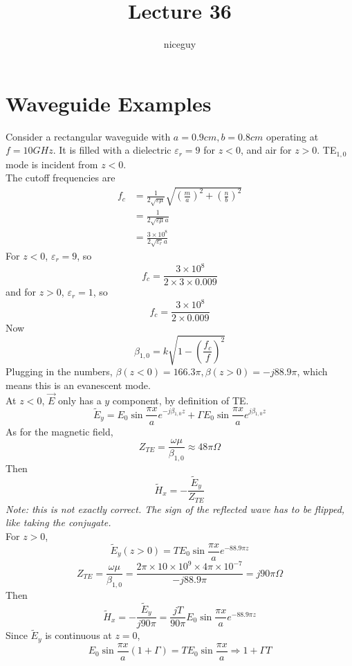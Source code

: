 \documentclass[12pt]{article}
\title{Lecture 36}
\author{niceguy}
\begin{document}
\maketitle

\section{Waveguide Examples}

\begin{ex}
    Consider a rectangular waveguide with $a = 0.9\unit{cm}, b = 0.8\unit{cm}$ operating at $f = 10\unit{GHz}$. It is filled with a dielectric $\varepsilon_r = 9$ for $z < 0$, and air for $z > 0$. TE$_{1,0}$ mode is incident from $z < 0$. \\
    The cutoff frequencies are
    \begin{align*}
        f_c &= \frac{1}{2\sqrt{\varepsilon\mu}} \sqrt{\left(\frac{m}{a}\right)^2 + \left(\frac{n}{b}\right)^2} \\
            &= \frac{1}{2\sqrt{\varepsilon\mu}a} \\
            &= \frac{3 \times 10^8}{2\sqrt{\varepsilon_r}a}
    \end{align*}
    For $z < 0$, $\varepsilon_r = 9$, so
    $$f_c = \frac{3 \times 10^8}{2 \times 3 \times 0.009}$$
    and for $z > 0$, $\varepsilon_r = 1$, so
    $$f_c = \frac{3 \times 10^8}{2 \times 0.009}$$
    Now
    $$\beta_{1,0} = k\sqrt{1 - \left(\frac{f_c}{f}\right)^2}$$
    Plugging in the numbers, $\beta(z < 0) = 166.3\pi, \beta(z > 0) = -j88.9\pi$, which means this is an evanescent mode. \\
    At $z < 0$, $\vec E$ only has a $y$ component, by definition of TE.
    $$\tilde E_y = E_0\sin\frac{\pi x}{a}e^{-j\beta_{1,0}z} + \Gamma E_0\sin\frac{\pi x}{a}e^{j\beta_{1,0}z}$$
    As for the magnetic field,
    $$Z_{TE} = \frac{\omega\mu}{\beta_{1,0}} \approx 48\pi\unit{\Omega}$$
    Then
    $$\tilde H_x = -\frac{\tilde E_y}{Z_{TE}}$$
    \textit{Note: this is not exactly correct. The sign of the reflected wave has to be flipped, like taking the conjugate.} \\
    For $z > 0$,
    $$\tilde E_y(z > 0) = TE_0 \sin\frac{\pi x}{a} e^{-88.9\pi z}$$
    $$Z_{TE} = \frac{\omega\mu}{\beta_{1,0}} = \frac{2\pi \times 10 \times 10^9 \times 4\pi \times 10^{-7}}{-j88.9\pi} = j90\pi\unit{\Omega}$$
    Then
    $$\tilde H_x = -\frac{\tilde E_y}{j90\pi} = \frac{jT}{90\pi}E_0\sin \frac{\pi x}{a}e^{-88.9\pi z}$$
    Since $\tilde E_y$ is continuous at $z=0$,
    $$E_0\sin\frac{\pi x}{a}(1+\Gamma) = TE_0\sin\frac{\pi x}{a} \Rightarrow 1 + \Gamma T$$

\end{ex}
\end{document}
